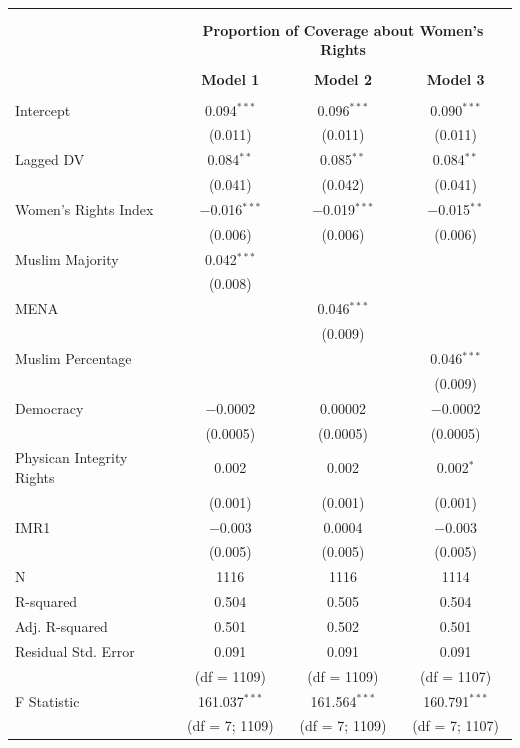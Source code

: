 \documentclass[11pt, oneside]{article}
\begin{document}
\begin{table}[!htbp] \centering 
  \caption{} 
  \label{} 
\begin{tabular}{@{\extracolsep{5pt}}lccc} 
\\[-1.8ex]\hline \\[-1.8ex] 
\\[-1.8ex] & \multicolumn{3}{c}{\textbf{Proportion of Coverage about Women's Rights}} \\ 
\\[-1.8ex] & \textbf{Model 1} & \textbf{Model 2} & \textbf{Model 3}\\ 
\hline \\[-1.8ex] 
 Intercept & 0.094$^{***}$ & 0.096$^{***}$ & 0.090$^{***}$ \\ 
  & (0.011) & (0.011) & (0.011) \\ 
  Lagged DV & 0.084$^{**}$ & 0.085$^{**}$ & 0.084$^{**}$ \\ 
  & (0.041) & (0.042) & (0.041) \\ 
  Women's Rights Index & $-$0.016$^{***}$ & $-$0.019$^{***}$ & $-$0.015$^{**}$ \\ 
  & (0.006) & (0.006) & (0.006) \\ 
  Muslim Majority & 0.042$^{***}$ &  &  \\ 
  & (0.008) &  &  \\ 
  MENA &  & 0.046$^{***}$ &  \\ 
  &  & (0.009) &  \\ 
  Muslim Percentage &  &  & 0.046$^{***}$ \\ 
  &  &  & (0.009) \\ 
  Democracy & $-$0.0002 & 0.00002 & $-$0.0002 \\ 
  & (0.0005) & (0.0005) & (0.0005) \\ 
  Physican Integrity Rights & 0.002 & 0.002 & 0.002$^{*}$ \\ 
  & (0.001) & (0.001) & (0.001) \\ 
  IMR1 & $-$0.003 & 0.0004 & $-$0.003 \\ 
  & (0.005) & (0.005) & (0.005) \\ 
 N & 1116 & 1116 & 1114 \\ 
R-squared & 0.504 & 0.505 & 0.504 \\ 
Adj. R-squared & 0.501 & 0.502 & 0.501 \\ 
Residual Std. Error & 0.091  & 0.091  & 0.091\\ 
 & (df = 1109) & (df = 1109) &  (df = 1107)  \\
F Statistic & 161.037$^{***}$ & 161.564$^{***}$  & 160.791$^{***}$  \\ 
  & (df = 7; 1109) & (df = 7; 1109) & (df = 7; 1107) \\ 


\end{tabular}
\end{table}
\end{document}
